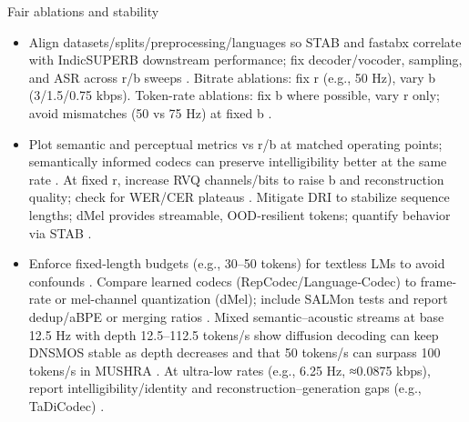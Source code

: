 Fair ablations and stability
\begin{itemize}
  \item Align datasets/splits/preprocessing/languages so STAB and fastabx correlate with IndicSUPERB downstream performance; fix decoder/vocoder, sampling, and ASR across r/b sweeps \cite{vashishth2024stabspeechtokenizerassessmentbenchmark,poli2025fastabxlibraryefficientcomputationabxdis,entry2025indicsuperbspeechprocessinguniversalperf}. Bitrate ablations: fix r (e.g., 50 Hz), vary b (3/1.5/0.75 kbps). Token-rate ablations: fix b where possible, vary r only; avoid mismatches (50 vs 75 Hz) at fixed b \cite{ahasan2025dmcodecdistillingmultimodalrepresentatio,li2024investigatingneuralaudiocodecsspeechlang}.
  \item Plot semantic and perceptual metrics vs r/b at matched operating points; semantically informed codecs can preserve intelligibility better at the same rate \cite{ye2024codecdoesmatterexploringsemanticshortcom}. At fixed r, increase RVQ channels/bits to raise b and reconstruction quality; check for WER/CER plateaus \cite{li2024investigatingneuralaudiocodecsspeechlang}. Mitigate DRI to stabilize sequence lengths; dMel provides streamable, OOD‑resilient tokens; quantify behavior via STAB \cite{bai2025dmelspeechtokenizationmadesimple,liu2024analyzingmitigatinginconsistencydiscrete,vashishth2024stabspeechtokenizerassessmentbenchmark}.
  \item Enforce fixed-length budgets (e.g., 30–50 tokens) for textless LMs to avoid confounds \cite{hsu2024exploringcontextlearningtextlessspeechla}. Compare learned codecs (RepCodec/Language‑Codec) to frame-rate or mel-channel quantization (dMel); include SALMon tests and report dedup/aBPE or merging ratios \cite{huang2024repcodecspeechrepresentationcodectokeniz,ji2025languagecodecbridgingdiscreterepresentat,zhang2025impactframeratesspeechtokenizercasestudy,maimon2025salmonsuiteacousticlanguagemodelevaluati}. Mixed semantic–acoustic streams at base 12.5 Hz with depth 12.5–112.5 tokens/s show diffusion decoding can keep DNSMOS stable as depth decreases and that 50 tokens/s can surpass 100 tokens/s in MUSHRA \cite{yang2025diffsoundstreamefficientspeechtokenizati,zeng2024scalingspeechtextpretrainingsyntheticint}. At ultra-low rates (e.g., 6.25 Hz, ≈0.0875 kbps), report intelligibility/identity and reconstruction–generation gaps (e.g., TaDiCodec) \cite{wang2025tadicodectextawarediffusionspeechtokeniz}.
\end{itemize}

